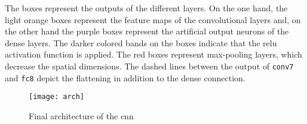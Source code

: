 The boxes represent the outputs of the different layers.
On the one hand, the light orange boxes represent the feature maps of the convolutional layers and, on the other hand the purple boxes represent the artificial output neurons of the dense layers.
The darker colored bands on the boxes indicate that the \acrshort{relu} activation function is applied.
The red boxes represent max-pooling layers, which decrease the spatial dimensions.
The dashed lines between the output of \texttt{conv7} and \texttt{fc8} depict the flattening in addition to the dense connection.

\begin{figure}
  \centering
  \texttt{[image: arch]}
  \caption{Final architecture of the \acrlong{cnn}}
  \label{fig:arch}
\end{figure}

